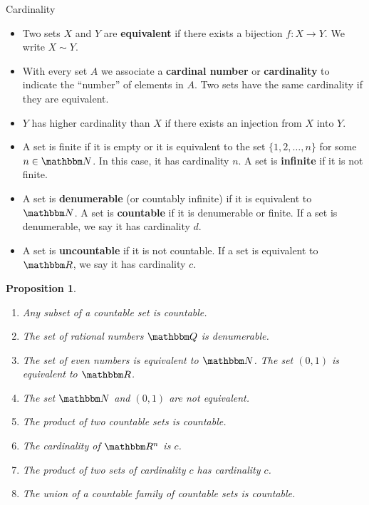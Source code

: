 \documentclass[9pt,aspectratio=169]{beamer}
\newcommand{\RR}{\mathbbm R}
\newcommand{\QQ}{\mathbbm Q}
\newcommand{\NN}{\mathbbm N}
\newtheorem{proposition}[theorem]{Proposition}
\begin{document}
\begin{frame}[allowframebreaks]{Cardinality}
    \begin{definition}
        \begin{itemize}
            \item Two sets $X$ and $Y$ are \textbf{equivalent} if there
            exists a bijection $f: X \to Y$. We write $X \sim Y$.
            \item With every set $A$ we associate a \textbf{cardinal number}
            or \textbf{cardinality} to indicate the ``number'' of elements in
            $A$. Two sets have the same cardinality if they are equivalent.
            \item $Y$ has higher cardinality than $X$ if there exists an
            injection from $X$ into $Y$.
        \end{itemize}
    \end{definition}
    \framebreak
    \begin{definition}
        \begin{itemize}
            \item A set is finite if it is empty or it is equivalent to the
            set $\{1, 2, \ldots, n\}$ for some $n \in \NN$. In this case, it
            has cardinality $n$. A set is \textbf{infinite} if it is not
            finite.
            \item A set is \textbf{denumerable} (or countably infinite) if it
            is equivalent to $\NN$. A set is \textbf{countable} if it is
            denumerable or finite. If a set is denumerable, we say it has
            cardinality $d$.
            \item A set is \textbf{uncountable} if it is not countable. If a
            set is equivalent to $\RR$, we say it has cardinality $c$.
        \end{itemize}
    \end{definition}
    \framebreak
    \begin{proposition}
        \begin{enumerate}
            \item Any subset of a countable set is countable.
            \item The set of rational numbers $\QQ$ is denumerable.
            \item The set of even numbers is equivalent to $\NN$. The set
            $(0, 1)$ is equivalent to $\RR$.
            \item The set $\NN$ and $(0, 1)$ are not equivalent.
            \item The product of two countable sets is countable.
            \item The cardinality of $\RR^n$ is $c$.
            \item The product of two sets of cardinality $c$ has cardinality $c$.
            \item The union of a countable family of countable sets is
            countable.
        \end{enumerate}
    \end{proposition}
\end{frame}
\end{document}
